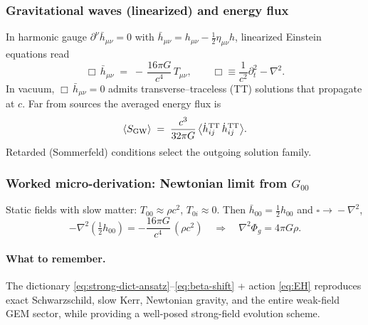 \subsubsection{Gravitational waves (linearized) and energy flux}
\label{sec:gw-linear}
In harmonic gauge $\partial^\nu \bar h_{\mu\nu}=0$ with $\bar h_{\mu\nu}=h_{\mu\nu}-\tfrac12\eta_{\mu\nu}h$, linearized Einstein equations read
\begin{equation}
\Box\,\bar h_{\mu\nu} \;=\; -\,\frac{16\pi G}{c^4}\,T_{\mu\nu},
\qquad \Box \equiv \frac{1}{c^2}\partial_t^2-\nabla^2 .
\label{eq:gw-wave}
\end{equation}
In vacuum, $\Box\,\bar h_{\mu\nu}=0$ admits transverse–traceless (TT) solutions that propagate at $c$. Far from sources the averaged energy flux is
\begin{equation}
\langle S_{\rm GW}\rangle \;=\; \frac{c^3}{32\pi G}\,\big\langle \dot h^{\rm TT}_{ij}\,\dot h^{\rm TT}_{ij}\big\rangle .
\label{eq:gw-flux}
\end{equation}
Retarded (Sommerfeld) conditions select the outgoing solution family.

\subsubsection{Worked micro-derivation: Newtonian limit from $G_{00}$}
\label{sec:newtonian-worked}
Static fields with slow matter: $T_{00}\approx \rho c^2$, $T_{0i}\!\approx\!0$. Then $\bar h_{00}=\tfrac12 h_{00}$ and $\square\!\to\! -\nabla^2$,
\[
-\nabla^2\!\left(\tfrac12 h_{00}\right)=-\frac{16\pi G}{c^4}\,(\rho c^2)
\quad\Rightarrow\quad
\nabla^2 \Phi_g = 4\pi G \rho.
\]
\paragraph{What to remember.}
The dictionary \eqref{eq:strong-dict-ansatz}--\eqref{eq:beta-shift} + action \eqref{eq:EH} reproduces exact Schwarzschild, slow Kerr, Newtonian gravity, and the entire weak-field GEM sector, while providing a well-posed strong-field evolution scheme.
